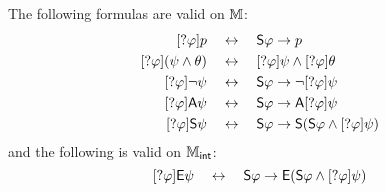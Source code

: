 \begin{proposition}
\label{exp_prop_sndann_reduction_axioms}
The following formulas are valid on $\mathbb{M}$:
\[
\begin{aligned}
  [\sndann\phi]p &\quad\liff\quad
      \S\phi \limplies p \\
  [\sndann\phi](\psi \land \theta) &\quad\liff\quad
      [\sndann\phi]\psi \land [\sndann\phi]\theta \\
  [\sndann\phi]\neg\psi &\quad\liff\quad
      \S\phi \limplies \neg[\sndann\phi]\psi \\
  [\sndann\phi]\A\psi &\quad\liff\quad
      \S\phi \limplies \A[\sndann\phi]\psi \\
  [\sndann\phi]\S\psi &\quad\liff\quad
      \S\phi \limplies \S(\S\phi \land [\sndann\phi]\psi)
\end{aligned}\]
and the following is valid on $\mathbb{M}_{\mathsf{int}}$:
\[
[?\varphi]\mathsf{E}\psi \quad\leftrightarrow\quad
    \mathsf{S}\varphi \to \mathsf{E}(\mathsf{S}\varphi \land [?\varphi]\psi)\]
\end{proposition}
